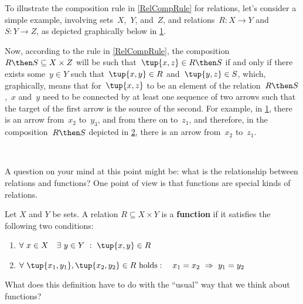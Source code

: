 To illustrate the composition rule in \cref{RelCompRule} for relations, let's consider a simple example, involving sets~$X$,~$Y$, and~$Z$, and relations~$R \colon X \to Y$ and $S \colon Y \to Z$, as depicted graphically below in \cref{fig:example_rel_composable}. 
\begin{figure}[h!]
\centering
{}
 \caption{}
\label{fig:example_rel_composable}
\end{figure}
Now, according to the rule in \cref{RelCompRule}, the composition~$R \then S \subseteq X \times Z$ will be such that~$\tup{x,z} \in R \then S$ if and only if there exists some~$y \in Y$ such that~$\tup{x,y} \in R$ and~$\tup{y,z} \in S$, which, graphically, means that for~$\tup{x,z}$ to be an element of the relation~$R \then S$,~$x$ and~$y$ need to be connected by at least one sequence of two arrows such that the target of the first arrow is the source of the second. For example, in \cref{fig:example_rel_composable}, there is an arrow from~$x_2$ to~$y_3$, and from there on to~$z_1$, and therefore, in the composition~$R \then S$ depicted in \cref{fig:example_rel_composed}, there is an arrow from~$x_2$ to~$z_1$. 
\begin{figure}[h!]
\centering
{}
 \caption{}
\label{fig:example_rel_composed}
\end{figure}


\

A question on your mind at this point might be: what is the relationship between relations and functions? One point of view is that functions are special kinds of relations. 

\begin{definition}\label{functions as relations}
Let $X$ and $Y$ be sets. A relation $R \subseteq X \times Y$ is a \textbf{function} if it satisfies the following two conditions: 
\begin{enumerate}
\item $\forall \ x \in X \quad \exists \ y \in Y \ : \ \tup{x,y} \in R$
\item $\forall \ \tup{x_1, y_1}, \tup{x_2, y_2} \in R \  \text{holds}: \quad x_1 = x_2 \ \Rightarrow \ y_1 = y_2$
\end{enumerate}
\end{definition}

What does this definition have to do with the ``usual'' way that we think about functions? 

